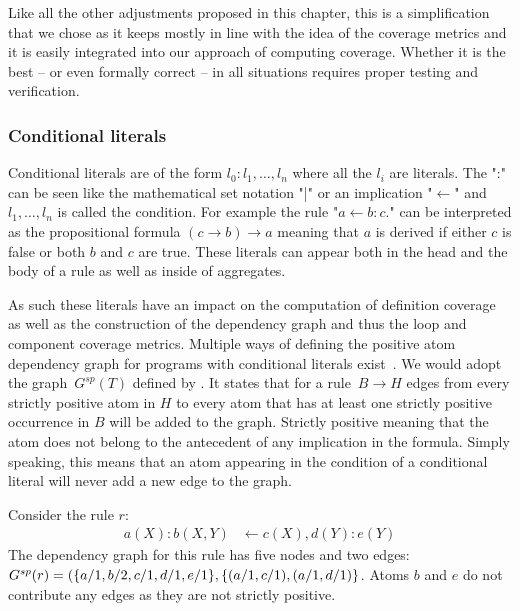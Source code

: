 Like all the other adjustments proposed in this chapter, this is a simplification that we chose as it keeps mostly in line with the idea of the coverage metrics and it is easily integrated into our approach of computing coverage. Whether it is the best -- or even formally correct -- in all situations requires proper testing and verification.


\subsubsection{Conditional literals}
\label{subsubsec:Coverage for further program classes/Language constructs/Conditional literals}
Conditional literals are of the form \(l_0 : l_1, \ldots, l_n\) where all the \(l_i\) are literals. The ":" can be seen like the mathematical set notation "|" or an implication "$\leftarrow$" and \(l_1, \ldots, l_n\) is called the condition. For example the rule "\(a \leftarrow b : c.\)" can be interpreted as the propositional formula \((c \rightarrow b) \rightarrow a\) meaning that $a$ is derived if either $c$ is false or both $b$ and $c$ are true. These literals can appear both in the head and the body of a rule as well as inside of aggregates.

As such these literals have an impact on the computation of definition coverage as well as the construction of the dependency graph and thus the loop and component coverage metrics. Multiple ways of defining the positive atom dependency graph for programs with conditional literals exist~\cite{FLL06, FL22}. We would adopt the graph~\(G^{sp}(T)\) defined by \textcite{FL22}. It states that for a rule~\(B \rightarrow H\) edges from every strictly positive atom in $H$ to every atom that has at least one strictly positive occurrence in $B$ will be added to the graph. Strictly positive meaning that the atom does not belong to the antecedent of any implication in the formula. Simply speaking, this means that an atom appearing in the condition of a conditional literal will never add a new edge to the graph.

\begin{example}
\label{ex:conditional literals}
    Consider the rule $r$:
    \begin{align*}
        a(X) : b(X, Y) &\leftarrow c(X), d(Y) : e(Y)
    \end{align*}
    The dependency graph for this rule has five nodes and two edges: \(G^{sp}(r) = (\{a/1, b/2, \\ c/1, d/1, e/1\}, \{(a/1, c/1), (a/1, d/1)\}\). Atoms $b$ and $e$ do not contribute any edges as they are not strictly positive.
\end{example}

